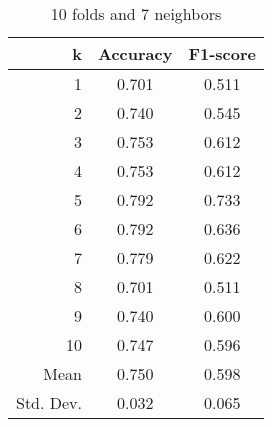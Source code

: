 \begin{table}
\centering
\caption{10 folds and 7 neighbors}
\begin{tabular}{rcc}
\toprule
         k &  Accuracy &  F1-score \\
\midrule
         1 &     0.701 &     0.511 \\
         2 &     0.740 &     0.545 \\
         3 &     0.753 &     0.612 \\
         4 &     0.753 &     0.612 \\
         5 &     0.792 &     0.733 \\
         6 &     0.792 &     0.636 \\
         7 &     0.779 &     0.622 \\
         8 &     0.701 &     0.511 \\
         9 &     0.740 &     0.600 \\
        10 &     0.747 &     0.596 \\
      Mean &     0.750 &     0.598 \\
 Std. Dev. &     0.032 &     0.065 \\
\bottomrule
\end{tabular}
\end{table}
